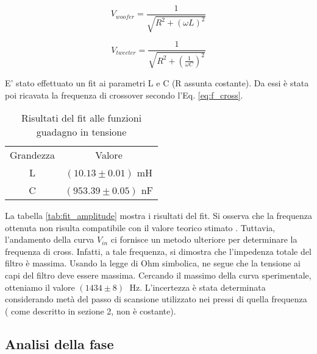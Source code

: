 \documentclass[../Relazione_circuiti]{subfiles}
\begin{document}
  \begin{equation}
    V_{woofer} = \frac{1}{\sqrt{R^2+(\omega L)^2}}
  \end{equation}

  \begin{equation}
    V_{tweeter} = \frac{1}{\sqrt{R^2+(\frac{1}{\omega C})^2}}
  \end{equation}



  E' stato effettuato un fit ai parametri L e C (R assunta costante). Da essi è stata poi ricavata la frequenza di
  crossover secondo l'Eq. \ref{eq:f_cross}.

  \begin{table}
    \centering

    \begin{tabular}{c | c }

      Grandezza & Valore                 \\

      L         & $(10.13 \pm 0.01)$ mH  \\
      C         & $(953.39 \pm 0.05)$ nF

    \end{tabular}

    \caption{Risultati del fit alle funzioni guadagno in tensione}
    \label{tab: fit_amplitude}

  \end{table}

  La tabella \ref{tab:fit_amplitude}
      mostra i risultati del fit. Si osserva che la frequenza ottenuta non risulta compatibile con il valore teorico
      stimato \theoryF.
  Tuttavia, l'andamento della curva $V_{in}$
      ci fornisce un metodo ulteriore per determinare la frequenza di cross. Infatti, a tale frequenza, si dimostra che
      l'impedenza totale del filtro è massima.
      Usando la legge di Ohm simbolica, ne segue che la tensione ai capi del filtro deve essere massima. Cercando il
      massimo della curva sperimentale, otteniamo il valore $(1434 \pm 8) \;$ Hz.
  L'incertezza è stata determinata considerando metà del passo di scansione utilizzato nei pressi di quella frequenza (
  come descritto in sezione 2, non è costante).

\subsection{Analisi della fase}
\end{document}
